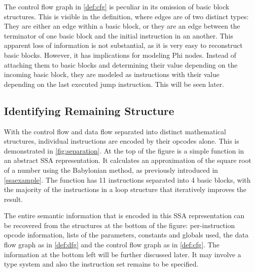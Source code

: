     The control flow graph in \autoref{def:cfg} is peculiar in its omission of
    basic block structures.
    This is visible in the definition, where edges are of two distinct types:
    They are either an edge within a basic block, or they are an edge between
    the terminator of one basic block and the initial instruction in an another.
    This apparent loss of information is not substantial, as it is very easy to
    reconstruct basic blocks.
    However, it has implications for modeling Phi nodes.
    Instead of attaching them to basic blocks and determining their value
    depending on the incoming basic block, they are modeled as instructions
    with their value depending on the last executed jump instruction.
    This will be seen later.

\subsection{Identifying Remaining Structure}

    With the control flow and data flow separated into distinct mathematical
    structures, individual instructions are encoded by their opcodes alone.
    This is demonstrated in \autoref{fig:separation}.
    At the top of the figure is a simple function in an abstract SSA
    representation.
    It calculates an approximation of the square root of a number using the
    Babylonian method, as previously introduced in \autoref{ssaexample}.
    The function has 11 instructions separated into 4 basic blocks, with the
    majority of the instructions in a loop structure that iteratively improves
    the result.

    The entire semantic information that is encoded in this SSA representation
    can be recovered from the structures at the bottom of the figure:
    per-instruction opcode information, lists of the parameters, constants and
    globals used, the data flow graph as in \autoref{def:dfg} and the control
    flow graph as in \autoref{def:cfg}.
    The information at the bottom left will be further discussed later.
    It may involve a type system and also the instruction set remains to be
    specified.

